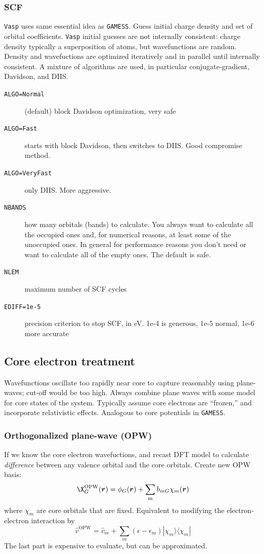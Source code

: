 \documentclass[11pt]{article}
\begin{document}
\subsubsection{SCF}
\label{sec:org108ddd4}
\texttt{Vasp} uses same essential idea as \texttt{GAMESS}. Guess initial charge density and set of orbital coefficients. \texttt{Vasp} initial guesses are not internally consistent: charge density typically a superposition of atoms, but wavefunctions are random.  Density and wavefuctions are optimized iteratively and in parallel until internally consistent. A mixture of algorithms are used, in particular conjugate-gradient, Davidson, and DIIS. 
\begin{description}
\item[{\texttt{ALGO=Normal}}] (default) block Davidson optimization, very safe
\item[{\texttt{ALGO=Fast}}] starts with block Davidson, then switches to DIIS.  Good compromise method.
\item[{\texttt{ALGO=VeryFast}}] only DIIS.  More aggressive.
\item[{\texttt{NBANDS}}] how many orbitals (bands) to calculate. You always want to calculate all the occupied ones and, for numerical reasons, at least some of the unoccupied ones. In general for performance reasons you don’t need or want to calculate all of the empty ones. The default is safe.
\item[{\texttt{NLEM}}] maximum number of SCF cycles
\item[{\texttt{EDIFF=1e-5}}] precision criterion to stop SCF, in eV.  1e-4 is generous, 1e-5 normal, 1e-6 more accurate
\end{description}
\subsection{Core electron treatment}
\label{sec:org35f1f1e}
Wavefunctions oscillate too rapidly near core to capture reasonably using plane-waves; cut-off would be too high. Always combine plane waves with some model for core states of the system.  Typically assume core electrons are ``frozen,'' and incorporate relativistic effects. Analogous to core potentials in \texttt{GAMESS}.
\subsubsection{Orthogonalized plane-wave (OPW)}
\label{sec:org8dae7c8}
If we know the core electron wavefuctions, and recast DFT model to calculate \emph{difference} between any valence orbital and the core orbitals.  Create new OPW basis:
\[ \X_G^\text{OPW}(\bm{r}) = \phi_G(\bm{r}) + \sum_\text{m} b_{mG} \chi_m(\bm{r}) \]
where \(\chi_m\) are core orbitals that are fixed. Equivalent to modifying the electron-electron interaction by
\[ \hat{v}^\text{OPW} = \hat{v}_\text{ee} + \sum_m (\epsilon - \epsilon_m) |\chi_m\rangle\langle\chi_m| \]
The last part is expensive to evaluate, but can be approximated.
\end{document}
